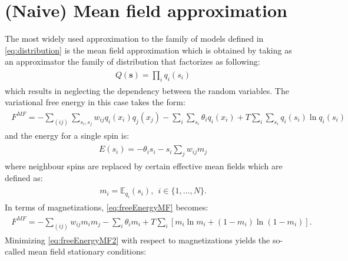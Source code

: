 
\section{(Naive) Mean field approximation}
The most widely used approximation to the family of models defined in \ref{eq:distribution} is the mean field approximation which is obtained by taking as an approximator the family of distribution that factorizes as following:
\begin{align}
\begin{split}
Q(\mathbf{s}) = \prod_i q_i(s_i)
\end{split}
\end{align}
which results in neglecting the dependency between the random variables. The variational free energy in this case takes the form:
\begin{align}
\begin{split}
F^{MF} = - \sum_{(ij)} \sum_{s_i, s_j} w_{ij} q_i(x_i)q_j(x_j) - \sum_{i}\sum_{s_i} \theta_i q_i(x_i) + T\sum_i \sum_{s_i} q_i(s_i)\ln q_i(s_i)
\label{eq:freeEnergyMF}
\end{split}
\end{align}
and the energy for a single spin is:
\begin{align}
\begin{split}
E(s_i) = - \theta_i s_i - s_i \sum_j  w_{ij} m_j
\end{split}
\end{align}
where neighbour spins are replaced by certain effective mean fields which are defined as:
 \begin{align}
\begin{split}
m_i = \mathbb{E}_{q_i} (s_i), ~~ i \in \{1, ..., N\}.
\end{split}
\end{align}
 In terms of magnetizations, \ref{eq:freeEnergyMF} becomes:
\begin{align}
\begin{split}
F^{MF} = - \sum_{(ij)} w_{ij} m_i m_j - \sum_{i} \theta_i m_i  + T\sum_i \left[ m_i \ln m_i + (1-m_i)\ln(1-m_i) \right].
\label{eq:freeEnergyMF2}
\end{split}
\end{align}
Minimizing \ref{eq:freeEnergyMF2} with respect to magnetizations yields the so-called mean field stationary conditions:
